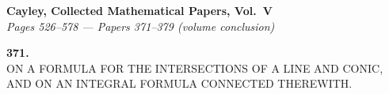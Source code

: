 \documentclass[11pt]{article}
\begin{document}
\begin{center}
{\large\bfseries Cayley, Collected Mathematical Papers, Vol.~V}\\[4pt]
{\itshape Pages 526--578 --- Papers 371--379 (volume conclusion)}
\end{center}

\medskip

\begin{center}\textbf{371.}\\[2pt]
ON A FORMULA FOR THE INTERSECTIONS OF A LINE AND CONIC, AND ON AN INTEGRAL FORMULA CONNECTED THEREWITH.\end{center}


\medskip
\end{document}
